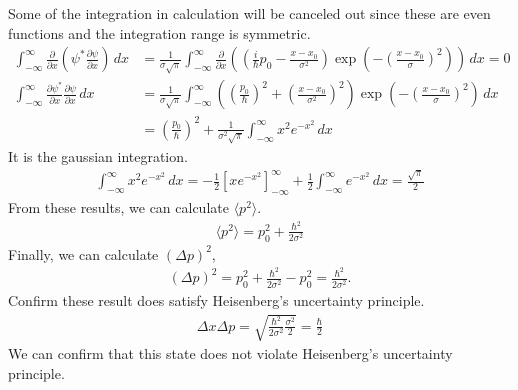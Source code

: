 \documentclass[floatfix,nofootinbib,superscriptaddress,fleqn]{revtex4}
\begin{document}
\begin{itemize}
Some of the integration in calculation will be canceled out 
since these are even functions 
and the integration range is symmetric.
  \begin{align}   
    \int_{-\infty}^{\infty} \frac{\partial}{\partial x}
     \left(\psi^* \frac{\partial \psi}{\partial x}
     \right) \,dx 
     &=\frac{1}{\sigma\sqrt{\pi}}\int_{-\infty}^{\infty}
     \frac{\partial}{\partial x}
     \left(\left(\frac{i}{\hbar}p_0-\frac{x-x_0}{\sigma^2}\right)
     \exp\left(-{\left(\frac{x-x_0}{\sigma}\right)}^2
     \right)\right)\,dx = 0 \\
     \int_{-\infty}^{\infty}
     \frac{\partial \psi^*}{\partial x}
     \frac{\partial \psi}{\partial x}\,dx 
      &=\frac{1}{\sigma\sqrt{\pi}}\int_{-\infty}^{\infty}
      \left(\left(\frac{p_0}{\hbar}\right)^2
      +\left(\frac{x-x_0}{\sigma^2}\right)^2\right)
      \exp\left(-{\left(\frac{x-x_0}{\sigma}
      \right)}^2\right)\,dx \\
     &=\left(\frac{p_0}{\hbar}\right)^2
     +\frac{1}{\sigma^2\sqrt{\pi}}
     \int_{-\infty}^{\infty} x^2e^{-x^2}\,dx
  \end{align}
It is the gaussian integration.
  \begin{align}
    \int_{-\infty}^{\infty} x^2e^{-x^2}\,dx 
    =-\frac{1}{2}\left[xe^{-x^2}\right]^{\infty}_{-\infty}
    +\frac{1}{2}\int_{-\infty}^{\infty} e^{-x^2}\,dx 
    =\frac{\sqrt{\pi}}{2}
  \end{align}
From these results, we can calculate $\langle p^2 \rangle$.
  \begin{align}
    \langle p^2 \rangle = p_0^2+\frac{\hbar^2}{2\sigma^2}
  \end{align}
Finally, we can calculate $\left( \Delta p \right)^2$,
  \begin{align}
    \left( \Delta p \right)^2 = p_0^2 + \frac{\hbar^2}{2\sigma^2}-p_0^2 
    = \frac{\hbar^2}{2\sigma^2}.
  \end{align}
Confirm these result does satisfy Heisenberg's uncertainty principle.
  \begin{align}
    \Delta x \Delta p =\sqrt{\frac{\hbar^2}{2\sigma^2}
    \frac{\sigma^2}{2}} 
    = \frac{\hbar}{2}
  \end{align}
We can confirm that this state does not violate 
Heisenberg's uncertainty principle.

\end{itemize}
\vspace{1cm}
\end{document}
